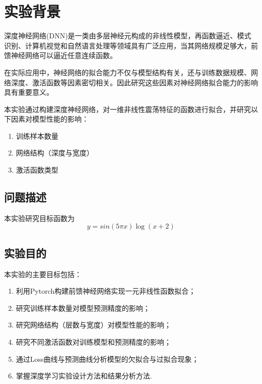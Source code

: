 
\chapter{实验背景}
\label{cha:intro}

深度神经网络(DNN)是一类由多层神经元构成的非线性模型，再函数逼近、模式识别、计算机视觉和自然语言处理等领域具有广泛应用，当其网络规模足够大，前馈神经网络可以逼近任意连续函数。

在实际应用中，神经网络的拟合能力不仅与模型结构有关，还与训练数据规模、网络深度、激活函数等因素密切相关。因此研究这些因素对神经网络拟合能力的影响具有重要意义。

本实验通过构建深度神经网络，对一维非线性震荡特征的函数进行拟合，并研究以下因素对模型性能的影响：
\begin{enumerate}[(1)]
    \item 训练样本数量
    \item 网络结构（深度与宽度）
    \item 激活函数类型  
\end{enumerate}

\section{问题描述}
本实验研究目标函数为
\begin{equation}\label{target_fun}
    y = sin(5\pi x)\log(x+2)
\end{equation}

\section{实验目的}
本实验的主要目标包括：
\begin{enumerate}[(1)]
    \item 利用Pytorch构建前馈神经网络实现一元非线性函数拟合；
    \item 研究训练样本数量对模型预测精度的影响；
    \item 研究网络结构（层数与宽度）对模型性能的影响；
    \item 研究不同激活函数对训练模型和预测精度的影响；
    \item 通过Loss曲线与预测曲线分析模型的欠拟合与过拟合现象；
    \item 掌握深度学习实验设计方法和结果分析方法.
\end{enumerate}